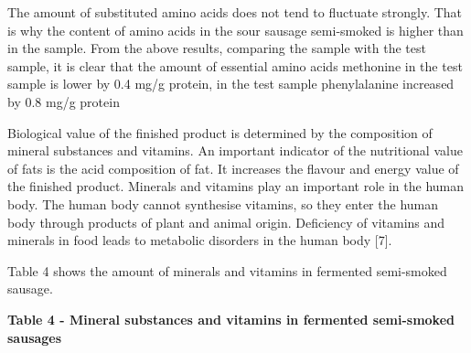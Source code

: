 The amount of substituted amino acids does not tend to fluctuate
strongly. That is why the content of amino acids in the sour sausage
semi-smoked is higher than in the sample. From the above results,
comparing the sample with the test sample, it is clear that the amount
of essential amino acids methonine in the test sample is lower by 0.4
mg/g protein, in the test sample phenylalanine increased by 0.8 mg/g
protein

Biological value of the finished product is determined by the
composition of mineral substances and vitamins. An important indicator
of the nutritional value of fats is the acid composition of fat. It
increases the flavour and energy value of the finished product. Minerals
and vitamins play an important role in the human body. The human body
cannot synthesise vitamins, so they enter the human body through
products of plant and animal origin. Deficiency of vitamins and minerals
in food leads to metabolic disorders in the human body {[}7{]}.

Table 4 shows the amount of minerals and vitamins in fermented
semi-smoked sausage.

{\bfseries Table 4 - Mineral substances and vitamins in fermented
semi-smoked sausages}

